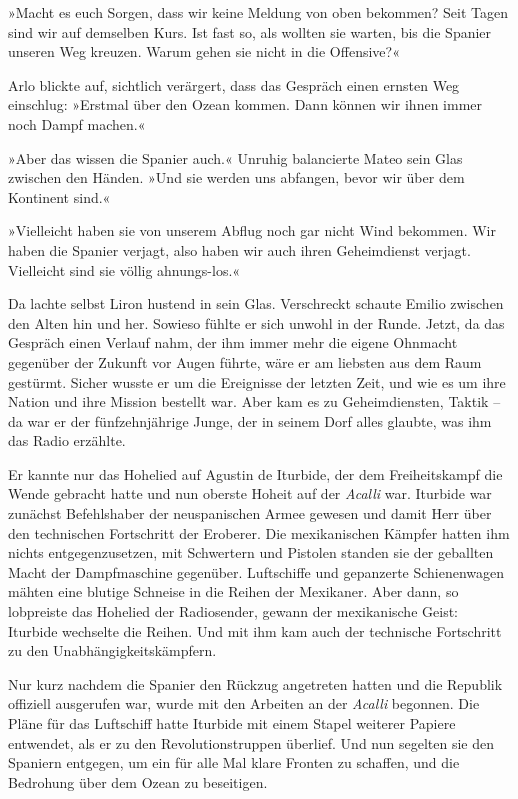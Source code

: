 »Macht es euch Sorgen, dass wir keine Meldung von oben bekommen?
Seit Tagen sind wir auf demselben Kurs. Ist fast so, als wollten
sie warten, bis die Spanier unseren Weg kreuzen. Warum gehen sie
nicht in die Offensive?«

Arlo blickte auf, sichtlich verärgert, dass das Gespräch einen
ernsten Weg einschlug: »Erstmal über den Ozean kommen. Dann können
wir ihnen immer noch Dampf machen.«

»Aber das wissen die Spanier auch.« Unruhig balancierte Mateo sein
Glas zwischen den Händen. »Und sie werden uns abfangen, bevor wir
über dem Kontinent sind.«

»Vielleicht haben sie von unserem Abflug noch gar nicht Wind
bekommen. Wir haben die Spanier verjagt, also haben wir auch ihren
Geheimdienst verjagt. Vielleicht sind sie völlig ahnungs-los.«

Da lachte selbst Liron hustend in sein Glas. Verschreckt schaute
Emilio zwischen den Alten hin und her. Sowieso fühlte er sich
unwohl in der Runde. Jetzt, da das Gespräch einen Verlauf nahm, der
ihm immer mehr die eigene Ohnmacht gegenüber der Zukunft vor Augen
führte, wäre er am liebsten aus dem Raum gestürmt. Sicher wusste er
um die Ereignisse der letzten Zeit, und wie es um ihre Nation und
ihre Mission bestellt war. Aber kam es zu Geheimdiensten, Taktik –
da war er der fünfzehnjährige Junge, der in seinem Dorf alles
glaubte, was ihm das Radio erzählte.

Er kannte nur das Hohelied auf Agustin de Iturbide, der dem
Freiheitskampf die Wende gebracht hatte und nun oberste Hoheit auf
der \textit{Acalli} war. Iturbide war zunächst Befehlshaber der
neuspanischen Armee gewesen und damit Herr über den technischen
Fortschritt der Eroberer. Die mexikanischen Kämpfer hatten ihm
nichts entgegenzusetzen, mit Schwertern und Pistolen standen sie
der geballten Macht der Dampfmaschine gegenüber. Luftschiffe und
gepanzerte Schienenwagen mähten eine blutige Schneise in die Reihen
der Mexikaner. Aber dann, so lobpreiste das Hohelied der
Radiosender, gewann der mexikanische Geist: Iturbide wechselte die
Reihen. Und mit ihm kam auch der technische Fortschritt zu den
Unabhängigkeitskämpfern.

Nur kurz nachdem die Spanier den Rückzug angetreten hatten und die
Republik offiziell ausgerufen war, wurde mit den Arbeiten an der
\textit{Acalli} begonnen. Die Pläne für das Luftschiff hatte Iturbide mit
einem Stapel weiterer Papiere entwendet, als er zu den
Revolutionstruppen überlief. Und nun segelten sie den Spaniern
entgegen, um ein für alle Mal klare Fronten zu schaffen, und die
Bedrohung über dem Ozean zu beseitigen.

